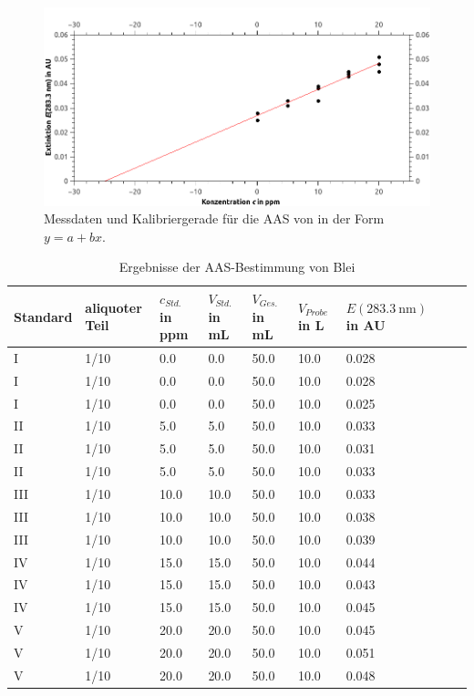   \begin{figure}[H]
    \includegraphics[scale=0.5, center]{images/KalibriergeradeAASPb.png} 
    \caption[Messdaten und Kalibriergerade für die AAS von , Quelle: Autor]{Messdaten und Kalibriergerade für die AAS von  in der Form $y = a + bx$.}
    \label{fig:KalibriergeradeBlei}
  \end{figure}
  
  \begin{table}[H]
    \centering
    \caption[Ergebnisse AAS, Quelle: Autor]{Ergebnisse der AAS-Bestimmung von Blei}
    
    \label{tab:ErgebnisseAAS}   
    \begin{tabular}{@{}l|lllll|lp{4.5cm}l@{}}
      \toprule
      Standard & aliquoter Teil & $c_{Std.}$ in \si{ppm} & $V_{Std.}$ in \si{\milli\liter} & $V_{Ges.}$ in \si{\milli\liter} & $V_{Probe}$ in \si{\liter} & $E\left(\SI[mode=text]{283.3}{\nano\meter}\right)$ in AU \\ \midrule
        I & 1/10 & 0.0 & 0.0 & 50.0 & 10.0 & 0.028 \\
        I & 1/10 & 0.0 & 0.0 & 50.0 & 10.0 & 0.028 \\
        I & 1/10 & 0.0 & 0.0 & 50.0 & 10.0 & 0.025 \\
       II & 1/10 & 5.0 & 5.0 & 50.0 & 10.0 & 0.033 \\
       II & 1/10 & 5.0 & 5.0 & 50.0 & 10.0 & 0.031 \\
       II & 1/10 & 5.0 & 5.0 & 50.0 & 10.0 & 0.033 \\
     III  & 1/10 & 10.0 & 10.0 & 50.0 & 10.0 & 0.033 \\
     III  & 1/10 & 10.0 & 10.0 & 50.0 & 10.0 & 0.038 \\
     III  & 1/10 & 10.0 & 10.0 & 50.0 & 10.0 & 0.039 \\
       IV & 1/10 & 15.0 & 15.0 & 50.0 & 10.0 & 0.044 \\
       IV & 1/10 & 15.0 & 15.0 & 50.0 & 10.0 & 0.043 \\
       IV & 1/10 & 15.0 & 15.0 & 50.0 & 10.0 & 0.045 \\
        V & 1/10 & 20.0 & 20.0 & 50.0 & 10.0 & 0.045 \\
        V & 1/10 & 20.0 & 20.0 & 50.0 & 10.0 & 0.051 \\
        V & 1/10 & 20.0 & 20.0 & 50.0 & 10.0 & 0.048 \\ \bottomrule
    \end{tabular}
  \end{table}
